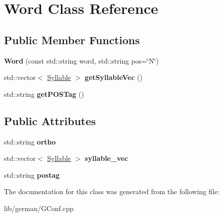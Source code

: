 \hypertarget{classWord}{\section{\-Word \-Class \-Reference}
\label{classWord}
}
\subsection*{\-Public \-Member \-Functions}
\begin{DoxyCompactItemize}
\item 
\hypertarget{classWord_ab7d70809800f9fc8c88a4887d80027aa}{{\bfseries \-Word} (const std\-::string word, std\-::string pos=\char`\"{}\-N\char`\"{})}\label{classWord_ab7d70809800f9fc8c88a4887d80027aa}

\item 
\hypertarget{classWord_ab57ae37bfceab0a6ba03481547dbb88f}{std\-::vector$<$ \hyperlink{classSyllable}{\-Syllable} $>$ {\bfseries get\-Syllable\-Vec} ()}\label{classWord_ab57ae37bfceab0a6ba03481547dbb88f}

\item 
\hypertarget{classWord_a7f67b86dc6b2902ebbed1bd0e8021a21}{std\-::string {\bfseries get\-P\-O\-S\-Tag} ()}\label{classWord_a7f67b86dc6b2902ebbed1bd0e8021a21}

\end{DoxyCompactItemize}
\subsection*{\-Public \-Attributes}
\begin{DoxyCompactItemize}
\item 
\hypertarget{classWord_abf6fb925954093ff446d2fbca9620898}{std\-::string {\bfseries ortho}}\label{classWord_abf6fb925954093ff446d2fbca9620898}

\item 
\hypertarget{classWord_a81ed20aa3b4de5d39b708e6e828a2e45}{std\-::vector$<$ \hyperlink{classSyllable}{\-Syllable} $>$ {\bfseries syllable\-\_\-vec}}\label{classWord_a81ed20aa3b4de5d39b708e6e828a2e45}

\item 
\hypertarget{classWord_a0d62ffe35181a817850d105b996f258c}{std\-::string {\bfseries postag}}\label{classWord_a0d62ffe35181a817850d105b996f258c}

\end{DoxyCompactItemize}


\-The documentation for this class was generated from the following file\-:\begin{DoxyCompactItemize}
\item 
lib/german/\-G\-Conf.\-cpp\end{DoxyCompactItemize}
